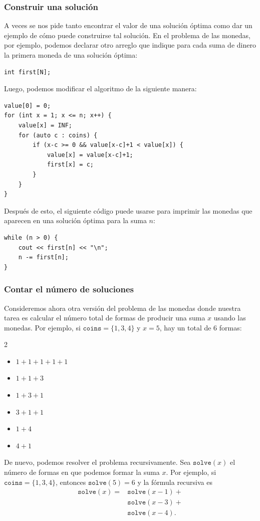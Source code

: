 \subsubsection{Construir una solución}

A veces se nos pide tanto encontrar el valor
de una solución óptima como dar
un ejemplo de cómo puede construirse tal solución.
En el problema de las monedas, por ejemplo,
podemos declarar otro arreglo
que indique para
cada suma de dinero la primera moneda
de una solución óptima:
\begin{lstlisting}
int first[N];
\end{lstlisting}
Luego, podemos modificar el algoritmo de la siguiente manera:
\begin{lstlisting}
value[0] = 0;
for (int x = 1; x <= n; x++) {
    value[x] = INF;
    for (auto c : coins) {
        if (x-c >= 0 && value[x-c]+1 < value[x]) {
            value[x] = value[x-c]+1;
            first[x] = c;
        }
    }
}
\end{lstlisting}
Después de esto, el siguiente código puede usarse para
imprimir las monedas que aparecen en una solución óptima para
la suma $n$:
\begin{lstlisting}
while (n > 0) {
    cout << first[n] << "\n";
    n -= first[n];
}
\end{lstlisting}

\subsubsection{Contar el número de soluciones}

Consideremos ahora otra versión
del problema de las monedas donde nuestra tarea es
calcular el número total de formas
de producir una suma $x$ usando las monedas.
Por ejemplo, si $\texttt{coins}=\{1,3,4\}$ y
$x=5$, hay un total de 6 formas:

\begin{multicols}{2}
\begin{itemize}
\item $1+1+1+1+1$
\item $1+1+3$
\item $1+3+1$
\item $3+1+1$
\item $1+4$
\item $4+1$
\end{itemize}
\end{multicols}

De nuevo, podemos resolver el problema recursivamente.
Sea $\texttt{solve}(x)$ el número de formas
en que podemos formar la suma $x$.
Por ejemplo, si $\texttt{coins}=\{1,3,4\}$,
entonces $\texttt{solve}(5)=6$ y la fórmula recursiva es
\begin{equation*}
\begin{split}
\texttt{solve}(x) = & \texttt{solve}(x-1) + \\
                    & \texttt{solve}(x-3) + \\
                    & \texttt{solve}(x-4)  .
\end{split}
\end{equation*}

